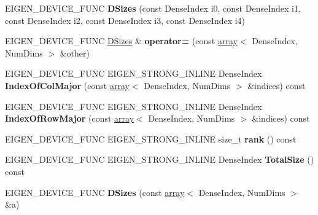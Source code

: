 \begin{DoxyCompactItemize}
\item 
\mbox{\label{struct_eigen_1_1_d_sizes_a57846297a65548998c5c78733c3ee550}} 
E\+I\+G\+E\+N\+\_\+\+D\+E\+V\+I\+C\+E\+\_\+\+F\+U\+NC {\bfseries D\+Sizes} (const Dense\+Index i0, const Dense\+Index i1, const Dense\+Index i2, const Dense\+Index i3, const Dense\+Index i4)
\item 
\mbox{\label{struct_eigen_1_1_d_sizes_a4f3590b533ebae90ce68f0140de4d022}} 
E\+I\+G\+E\+N\+\_\+\+D\+E\+V\+I\+C\+E\+\_\+\+F\+U\+NC \hyperlink{struct_eigen_1_1_d_sizes}{D\+Sizes} \& {\bfseries operator=} (const \hyperlink{class_eigen_1_1array}{array}$<$ Dense\+Index, Num\+Dims $>$ \&other)
\item 
\mbox{\label{struct_eigen_1_1_d_sizes_ab782efe1803d83cca93eb7efb942f5b9}} 
E\+I\+G\+E\+N\+\_\+\+D\+E\+V\+I\+C\+E\+\_\+\+F\+U\+NC E\+I\+G\+E\+N\+\_\+\+S\+T\+R\+O\+N\+G\+\_\+\+I\+N\+L\+I\+NE Dense\+Index {\bfseries Index\+Of\+Col\+Major} (const \hyperlink{class_eigen_1_1array}{array}$<$ Dense\+Index, Num\+Dims $>$ \&indices) const
\item 
\mbox{\label{struct_eigen_1_1_d_sizes_af393d79554f9015bf9b20862b876db3d}} 
E\+I\+G\+E\+N\+\_\+\+D\+E\+V\+I\+C\+E\+\_\+\+F\+U\+NC E\+I\+G\+E\+N\+\_\+\+S\+T\+R\+O\+N\+G\+\_\+\+I\+N\+L\+I\+NE Dense\+Index {\bfseries Index\+Of\+Row\+Major} (const \hyperlink{class_eigen_1_1array}{array}$<$ Dense\+Index, Num\+Dims $>$ \&indices) const
\item 
\mbox{\label{struct_eigen_1_1_d_sizes_aa9856dffd1c7d66b27a208280bd09d22}} 
E\+I\+G\+E\+N\+\_\+\+D\+E\+V\+I\+C\+E\+\_\+\+F\+U\+NC E\+I\+G\+E\+N\+\_\+\+S\+T\+R\+O\+N\+G\+\_\+\+I\+N\+L\+I\+NE size\+\_\+t {\bfseries rank} () const
\item 
\mbox{\label{struct_eigen_1_1_d_sizes_aaa880c9fd53051ef158094e1e529e1f0}} 
E\+I\+G\+E\+N\+\_\+\+D\+E\+V\+I\+C\+E\+\_\+\+F\+U\+NC E\+I\+G\+E\+N\+\_\+\+S\+T\+R\+O\+N\+G\+\_\+\+I\+N\+L\+I\+NE Dense\+Index {\bfseries Total\+Size} () const
\item 
\mbox{\label{struct_eigen_1_1_d_sizes_a2406350b7540a8952c2f0622e4295ef5}} 
E\+I\+G\+E\+N\+\_\+\+D\+E\+V\+I\+C\+E\+\_\+\+F\+U\+NC {\bfseries D\+Sizes} (const \hyperlink{class_eigen_1_1array}{array}$<$ Dense\+Index, Num\+Dims $>$ \&a)

\end{DoxyCompactItemize}
